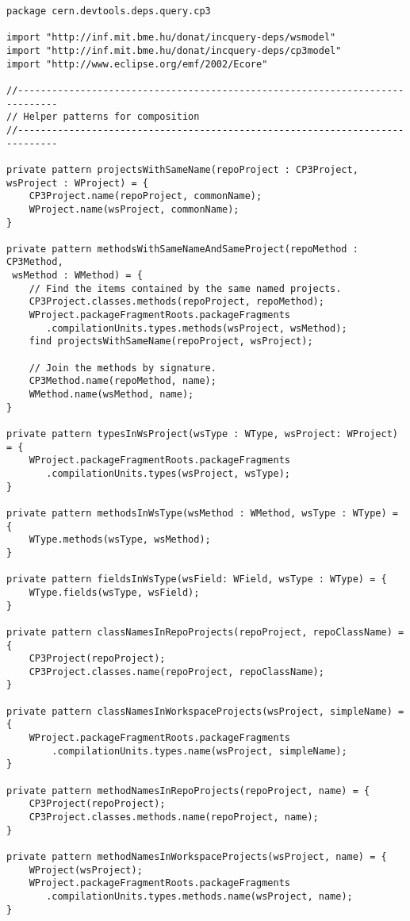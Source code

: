 \begin{lstlisting}
package cern.devtools.deps.query.cp3

import "http://inf.mit.bme.hu/donat/incquery-deps/wsmodel"
import "http://inf.mit.bme.hu/donat/incquery-deps/cp3model"
import "http://www.eclipse.org/emf/2002/Ecore"

//-----------------------------------------------------------------------------
// Helper patterns for composition
//-----------------------------------------------------------------------------

private pattern projectsWithSameName(repoProject : CP3Project, wsProject : WProject) = {
	CP3Project.name(repoProject, commonName);
	WProject.name(wsProject, commonName);
}

private pattern methodsWithSameNameAndSameProject(repoMethod : CP3Method, 
 wsMethod : WMethod) = {
	// Find the items contained by the same named projects.
	CP3Project.classes.methods(repoProject, repoMethod);
	WProject.packageFragmentRoots.packageFragments
	   .compilationUnits.types.methods(wsProject, wsMethod);
	find projectsWithSameName(repoProject, wsProject);

	// Join the methods by signature.
	CP3Method.name(repoMethod, name);
	WMethod.name(wsMethod, name);
}

private pattern typesInWsProject(wsType : WType, wsProject: WProject) = {
	WProject.packageFragmentRoots.packageFragments
	   .compilationUnits.types(wsProject, wsType);
}

private pattern methodsInWsType(wsMethod : WMethod, wsType : WType) = {
	WType.methods(wsType, wsMethod);	
}

private pattern fieldsInWsType(wsField: WField, wsType : WType) = {
	WType.fields(wsType, wsField);	
}

private pattern classNamesInRepoProjects(repoProject, repoClassName) = {
	CP3Project(repoProject);
	CP3Project.classes.name(repoProject, repoClassName);
}

private pattern classNamesInWorkspaceProjects(wsProject, simpleName) = {
	WProject.packageFragmentRoots.packageFragments
	    .compilationUnits.types.name(wsProject, simpleName);
}

private pattern methodNamesInRepoProjects(repoProject, name) = {
	CP3Project(repoProject);
	CP3Project.classes.methods.name(repoProject, name);
}

private pattern methodNamesInWorkspaceProjects(wsProject, name) = {
	WProject(wsProject);
	WProject.packageFragmentRoots.packageFragments
	   .compilationUnits.types.methods.name(wsProject, name);
}


\end{lstlisting}
